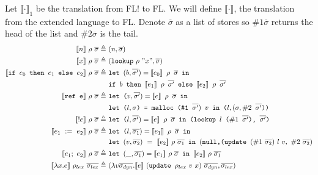 \documentclass[10pt]{article}
\begin{document}
\begin{enumerate} [(a)]
    Let $\llbracket \cdot \rrbracket_1$ be the translation from FL! to FL. We will define $\llbracket \cdot \rrbracket$, the translation from the extended language to FL. Denote $\overline{\sigma}$ as a list of stores so $\# 1 \overline{\sigma}$ returns the head of the list and $\# 2 \overline{\sigma}$ is the tail.
    \begin{align*}
    \llbracket n\rrbracket~\rho~\overline{\sigma} \triangleq&~(n, \overline{\sigma})\\
    \llbracket x\rrbracket~\rho~\overline{\sigma} \triangleq&~(\texttt{lookup}~\rho~"x", \overline{\sigma})\\
    \llbracket \texttt{if $e_0$ then $e_1$ else $e_2$}\rrbracket~\rho~\overline{\sigma} \triangleq&~ \texttt{let $(b,\overline{\sigma'}) = \llbracket e_0 \rrbracket~\rho~\overline \sigma$ in }\\
    &~\texttt{if $b$ then $\llbracket e_1 \rrbracket ~\rho~\overline{\sigma'}$ else $\llbracket e_2 \rrbracket ~\rho~\overline{\sigma'}$}\\
    \llbracket \texttt{ref e}\rrbracket~\rho~\overline{\sigma} \triangleq&~\texttt{let ($v,\overline{\sigma'}) = \llbracket e \rrbracket~\rho~\overline \sigma$ in}\\
    &~\texttt{let ($l, \sigma$) = malloc (\#1~$\overline{\sigma'})~v$ in ($l, (\sigma, \#2~\overline{\sigma'}$))}\\
    \llbracket !e \rrbracket~\rho~\overline{\sigma} \triangleq&~\texttt{let ($l,\overline{\sigma'}) = \llbracket e \rrbracket~\rho~\overline \sigma$ in (lookup $l$ ($\#1~\overline{\sigma'}$), $\overline{\sigma'}$)}\\
    \llbracket e_1~:=~e_2 \rrbracket~\rho~\overline{\sigma} \triangleq&~\texttt{let ($l,\overline{\sigma_1}) = \llbracket e_1 \rrbracket~\rho~\overline \sigma$ in}\\
    &~\texttt{let } (v, \overline{\sigma_2})~=~ \llbracket e_2 \rrbracket~ \rho ~ \overline{\sigma_1} \texttt{ in } (\texttt{null,(update } (\#1~\overline{\sigma_2})~l~v,~\#2~\overline{\sigma_2})\\
    \llbracket e_1;~e_2 \rrbracket~\rho~\overline{\sigma} \triangleq&~\texttt{let } (\_,\overline{\sigma_1}) = \llbracket e_1 \rrbracket~\rho~\overline \sigma \texttt{ in } \llbracket e_2 \rrbracket~\rho~\overline{\sigma_1}\\
    \llbracket \lambda x. e \rrbracket~\rho_{lex}~\overline{\sigma_{lex}} \triangleq&~( \lambda v \overline{\sigma_{dyn}}.\llbracket e \rrbracket ~ (\texttt{update } \rho_{lex} ~ v ~ x)~\overline{\sigma_{dyn}}, \overline{\sigma_{lex}})\\

\end{align*}
\end{enumerate}
\end{document}

